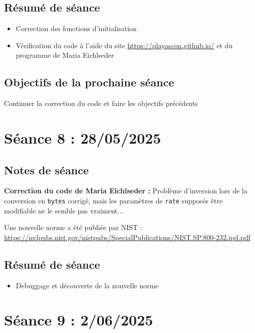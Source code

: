 \documentclass[12pt]{article}
\newcommand{\cmark}{\ding{51}}%
\newcommand{\done}{\rlap{$\square$}{\raisebox{2pt}{\large\hspace{1pt}\cmark}}%
	\hspace{-2.5pt}}
\begin{document}
	\subsection{Résumé de séance}
	\begin{itemize}
		\item Correction des fonctions d'initialisation
		\item Vérification du code à l'aide du site \url{https://playascon.github.io/} et du programme de Maria Eichlseder
	\end{itemize}
	
	\subsection{Objectifs de la prochaine séance}
	\begin{todolist}
		\item[\done] Continuer la correction du code et faire les objectifs précédents
	\end{todolist}
	
	
	\section{Séance 8 : 28/05/2025}
	\subsection{Notes de séance}
	\noindent \textbf{Correction du code de Maria Eichlseder :} Problème d'inversion lors de la conversion en \verb|bytes| corrigé, mais les paramètres de \verb|rate| supposés être modifiable ne le semble pas vraiment...
	
	\noindent Une nouvelle norme a été publiée par NIST : \url{https://nvlpubs.nist.gov/nistpubs/SpecialPublications/NIST.SP.800-232.ipd.pdf}
	
	\subsection{Résumé de séance}
	\begin{itemize}
		\item Debuggage et découverte de la nouvelle norme
	\end{itemize}
	
	\section{Séance 9 : 2/06/2025}
\end{document}

